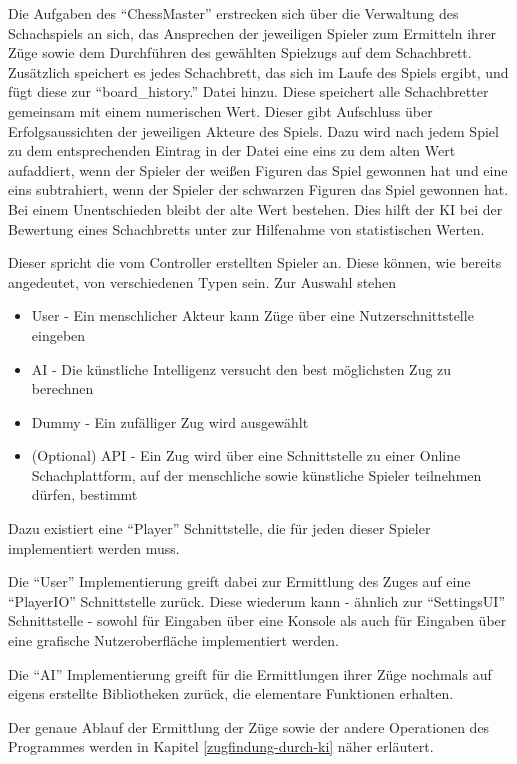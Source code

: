 Die Aufgaben des ``ChessMaster'' erstrecken sich über die Verwaltung des Schachspiels an sich, das Ansprechen der jeweiligen Spieler zum Ermitteln ihrer Züge sowie dem Durchführen des gewählten Spielzugs auf dem Schachbrett. Zusätzlich speichert es jedes Schachbrett, das sich im Laufe des Spiels ergibt, und fügt diese zur ``board\_history.'' Datei hinzu. Diese speichert alle Schachbretter gemeinsam mit einem numerischen Wert. Dieser gibt Aufschluss über Erfolgsaussichten der jeweiligen Akteure des Spiels. Dazu wird nach jedem Spiel zu dem entsprechenden Eintrag in der Datei eine eins zu dem alten Wert aufaddiert, wenn der Spieler der weißen Figuren das Spiel gewonnen hat und eine eins subtrahiert, wenn der Spieler der schwarzen Figuren das Spiel gewonnen hat. Bei einem Unentschieden bleibt der alte Wert bestehen. Dies hilft der KI bei der Bewertung eines Schachbretts unter zur Hilfenahme von statistischen Werten. 

Dieser spricht die vom Controller erstellten Spieler an. Diese können, wie bereits angedeutet, von verschiedenen Typen sein. Zur Auswahl stehen
\begin{itemize}
\item User - Ein menschlicher Akteur kann Züge über eine Nutzerschnittstelle eingeben
\item AI - Die künstliche Intelligenz versucht den best möglichsten Zug zu berechnen
\item Dummy - Ein zufälliger Zug wird ausgewählt
\item (Optional) API - Ein Zug wird über eine Schnittstelle zu einer Online Schachplattform, auf der menschliche sowie künstliche Spieler teilnehmen dürfen, bestimmt
\end{itemize}

Dazu existiert eine ``Player'' Schnittstelle, die für jeden dieser Spieler implementiert werden muss.

Die ``User'' Implementierung greift dabei zur Ermittlung des Zuges auf eine ``PlayerIO'' Schnittstelle zurück. Diese wiederum kann - ähnlich zur ``SettingsUI'' Schnittstelle - sowohl für Eingaben über eine Konsole als auch für Eingaben über eine grafische Nutzeroberfläche implementiert werden.

Die ``AI'' Implementierung greift für die Ermittlungen ihrer Züge nochmals auf eigens erstellte Bibliotheken zurück, die elementare Funktionen erhalten.

Der genaue Ablauf der Ermittlung der Züge sowie der andere Operationen des Programmes werden in Kapitel \ref{zugfindung-durch-ki}  näher erläutert.

